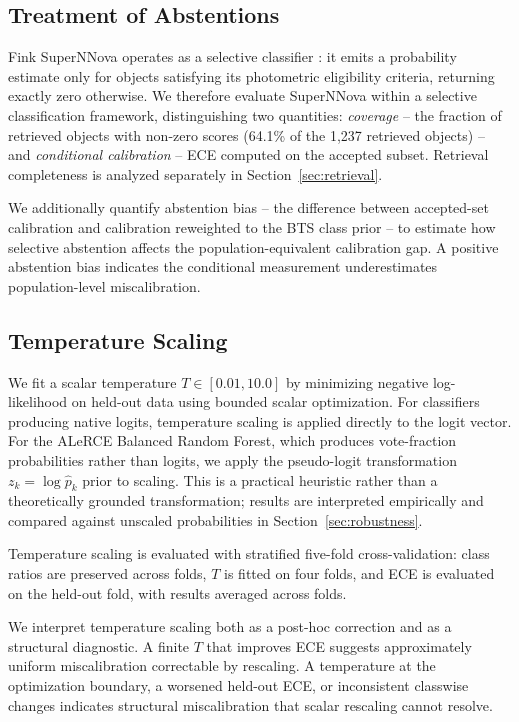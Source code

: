 \documentclass[twocolumn]{aastex631}
\begin{document}
\subsection{Treatment of Abstentions}\label{sec:abstentions}

Fink SuperNNova operates as a selective classifier
\citep{geifman2017}: it emits a probability estimate only for
objects satisfying its photometric eligibility criteria, returning
exactly zero otherwise. We therefore evaluate SuperNNova within
a selective classification framework, distinguishing two
quantities: \textit{coverage} -- the fraction of retrieved objects
with non-zero scores (64.1\% of the 1,237 retrieved objects) -- and
\textit{conditional calibration} -- ECE computed on the accepted
subset. Retrieval completeness is analyzed separately in
Section~\ref{sec:retrieval}.

We additionally quantify abstention bias -- the difference between
accepted-set calibration and calibration reweighted to the BTS
class prior -- to estimate how selective abstention affects the
population-equivalent calibration gap. A positive abstention bias
indicates the conditional measurement underestimates
population-level miscalibration.

\subsection{Temperature Scaling}\label{sec:tempscaling_methods}

We fit a scalar temperature $T \in [0.01, 10.0]$ by minimizing
negative log-likelihood on held-out data using bounded scalar
optimization. For classifiers producing native logits, temperature
scaling is applied directly to the logit vector. For the ALeRCE
Balanced Random Forest, which produces vote-fraction probabilities
rather than logits, we apply the pseudo-logit transformation
$z_k = \log \hat{p}_k$ prior to scaling. This is a practical
heuristic rather than a theoretically grounded transformation;
results are interpreted empirically and compared against unscaled
probabilities in Section~\ref{sec:robustness}.

Temperature scaling is evaluated with stratified five-fold
cross-validation: class ratios are preserved across folds, $T$
is fitted on four folds, and ECE is evaluated on the held-out
fold, with results averaged across folds.

We interpret temperature scaling both as a post-hoc correction
and as a structural diagnostic. A finite $T$ that improves ECE
suggests approximately uniform miscalibration correctable by
rescaling. A temperature at the optimization boundary, a worsened
held-out ECE, or inconsistent classwise changes indicates
structural miscalibration that scalar rescaling cannot resolve.
\end{document}
